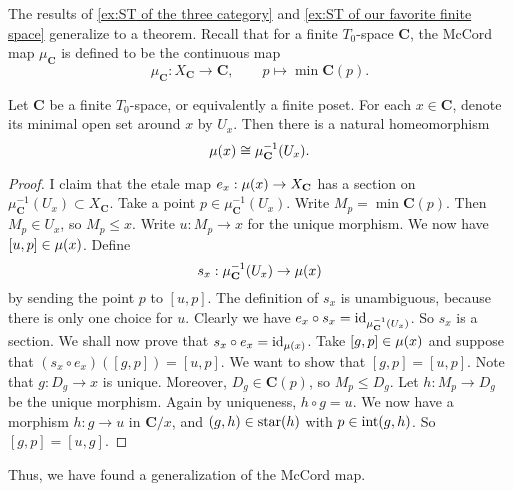 The results of \cref{ex:ST of the three category} and \cref{ex:ST of our favorite finite space} generalize to a theorem. Recall that for a finite $T_0$-space $\mathbf{C}$, the McCord map $\mu_\mathbf{C}$ is defined to be the continuous map
\[ \mu_\mathbf{C} : X_{\mathbf{C}} \to \mathbf{C}, \qquad p \mapsto \min \mathbf{C}(p). \]

\begin{theorem}
\label{thm:mccord functor generalizes the mccord map}
Let $\mathbf{C}$ be a finite $T_0$-space, or equivalently a finite poset. For each $x \in \mathbf{C}$, denote its minimal open set around $x$ by $U_x$. Then there is a natural homeomorphism
\[ \operatorname{\mu}(x) \cong \mu_\mathbf{C}^{-1}(U_x). \]
\end{theorem}
\begin{proof}
I claim that the etale map $e_x : \operatorname{\mu}(x) \to X_\mathbf{C}$ has a section on $\mu_\mathbf{C}^{-1}(U_x) \subset X_\mathbf{C}$. Take a point $p \in \mu_\mathbf{C}^{-1}(U_x)$. Write $M_p = \min \mathbf{C}(p)$. 
Then $M_p \in U_x$, so $M_p \leq x$. Write $u : M_p \to x$ for the unique morphism. We now have $[u,p] \in \operatorname{\mu}(x)$. 
Define
\[ s_x : \mu_\mathbf{C}^{-1}(U_x) \to \operatorname{\mu}(x) \]
by sending the point $p$ to $[u,p]$. The definition of $s_x$ is unambiguous, because there is only one choice for $u$. Clearly we have $e_x \circ s_x = \operatorname{id}_{\mu_{\mathbf{C}}^{-1}\left(U_x \right)}$. So $s_x$ is a section. We shall now prove that $s_x \circ e_x = \operatorname{id}_{\operatorname{\mu}(x)}$. Take $[g,p] \in \operatorname{\mu}(x)$ and suppose that $(s_x \circ e_x)([g,p]) = [u,p]$. We want to show that $[g,p] = [u,p]$. Note that $g : D_g \to x$ is unique. Moreover, $D_g \in \mathbf{C}(p)$, so $M_p \leq D_g$. Let $h : M_p \to D_g$ be the unique morphism. Again by uniqueness, $h \circ g = u$. We now have a morphism $h : g \to u$ in $\mathbf{C}/x$, and $(g,h) \in \operatorname{star}(h)$ with $p \in \operatorname{int}(g,h)$. So $[g,p] = [u,g]$.
\end{proof}

Thus, we have found a generalization of the McCord map.


